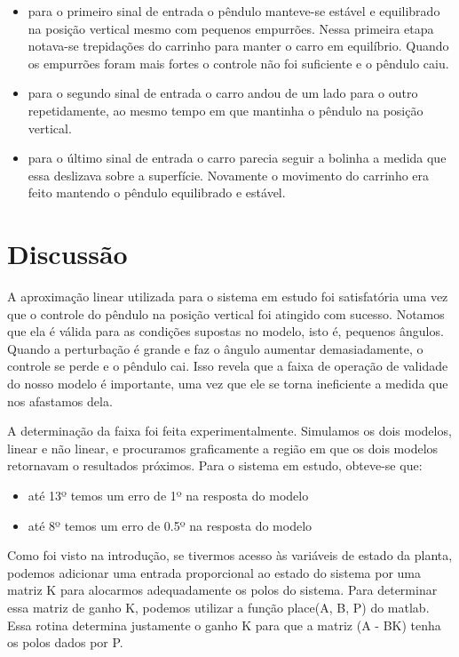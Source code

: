 \documentclass[journal]{IEEEtran}
\begin{document}
\begin{itemize}
 \item
para o primeiro sinal de entrada o 
pêndulo manteve-se estável e equilibrado na posição vertical mesmo 
com pequenos empurrões. Nessa primeira etapa notava-se trepidações 
do carrinho para manter o carro em equilíbrio. Quando os empurrões 
foram mais fortes o controle não foi suficiente e o pêndulo caiu.

\item
para o segundo sinal de entrada o carro andou de um lado para o outro
repetidamente, ao mesmo tempo em que mantinha o pêndulo na posição 
vertical.

\item
para o último sinal de entrada o carro parecia seguir a bolinha 
a medida que essa deslizava sobre a superfície. Novamente o movimento
do carrinho era feito mantendo o pêndulo equilibrado e estável.
\end{itemize}
\section{Discussão}
A aproximação linear utilizada para o sistema em estudo foi 
satisfatória uma vez que o controle do pêndulo na posição vertical
foi atingido com sucesso. Notamos que ela é válida para as condições 
supostas no modelo, isto é, pequenos ângulos. Quando a 
perturbação é grande e faz o ângulo aumentar demasiadamente, o 
controle se perde e o pêndulo cai. Isso revela que a faixa de operação
de validade do nosso modelo é importante, uma vez que ele se torna 
ineficiente a medida que nos afastamos dela. 

A determinação da faixa foi feita experimentalmente. Simulamos os 
dois modelos, linear e não linear, e procuramos graficamente 
a região em que os dois modelos retornavam o resultados próximos.
Para o sistema em estudo, obteve-se que:

\begin{itemize}
\item até 13º temos um erro de 1º na resposta do modelo
\item até 8º temos um erro de 0.5º na resposta do modelo
\end{itemize}



Como foi visto na introdução, se tivermos acesso às variáveis de
estado da planta, podemos adicionar uma entrada proporcional ao estado
do sistema por uma matriz K para alocarmos adequadamente os polos do 
sistema. Para determinar essa matriz de ganho K, podemos utilizar a 
função place(A, B, P) do matlab. Essa rotina determina justamente o 
ganho K para
que a matriz (A - BK) tenha os polos dados por P.
\end{document}
